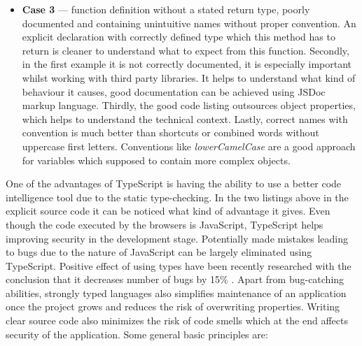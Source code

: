 \documentclass{article} %
\begin{document}
\begin{itemize}
    \item \textbf{Case 3} --- function definition without a stated return type, poorly documented and containing unintuitive names without proper convention. An explicit declaration with correctly defined type which this method has to return is cleaner to understand what to expect from this function. Secondly, in the first example it is not correctly documented, it is especially important whilst working with third party libraries. It helps to understand what kind of behaviour it causes, good documentation can be achieved using JSDoc markup language. Thirdly, the good code listing outsources object properties, which helps to understand the technical context. Lastly, correct names with convention is much better than shortcuts or combined words without uppercase first letters. Conventions like \textit{lowerCamelCase} are a good approach for variables which supposed to contain more complex objects.
\end{itemize}
One of the advantages of TypeScript is having the ability to use a better code intelligence tool due to the static type-checking. In the two listings above in the explicit source code it can be noticed what kind of advantage it gives. Even though the code executed by the browsers is JavaScript, TypeScript helps improving security in the development stage. Potentially made mistakes leading to bugs due to the nature of JavaScript can be largely eliminated using TypeScript. Positive effect of using types have been recently researched with the conclusion that it decreases number of bugs by 15\% \cite{bib:type_study}. Apart from bug-catching abilities, strongly typed languages also simplifies maintenance of an application once the project grows and reduces the risk of overwriting properties.
\newline
Writing clear source code also minimizes the risk of code smells which at the end affects security of the application. Some general basic principles \cite{bib:cleancode} are:
\end{document}
